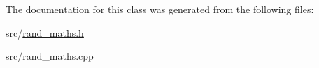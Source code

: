 The documentation for this class was generated from the following files\+:\begin{DoxyCompactItemize}
\item 
src/\mbox{\hyperlink{rand__maths_8h}{rand\+\_\+maths.\+h}}\item 
src/rand\+\_\+maths.\+cpp\end{DoxyCompactItemize}
